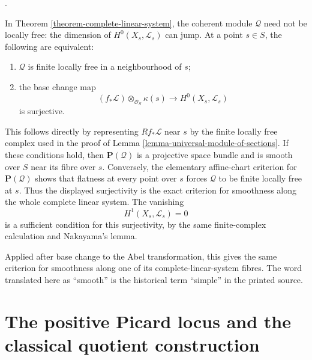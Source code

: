 \begin{remark}
\label{remark-complete-linear-system-base-change}
\begin{reference}
\cite[Expos\'e 232, Remark 4.5, pp. 153--154]{FGA}.
\end{reference}
In Theorem \ref{theorem-complete-linear-system}, the coherent module
$\mathcal{Q}$ need not be locally free: the dimension of
$H^0(X_s, \mathcal{L}_s)$ can jump. At a point $s \in S$, the following are
equivalent:
\begin{enumerate}
\item $\mathcal{Q}$ is finite locally free in a neighbourhood of $s$;
\item the base change map
$$
(f_*\mathcal{L}) \otimes_{\mathcal{O}_S} \kappa(s)
\longrightarrow H^0(X_s, \mathcal{L}_s)
$$
is surjective.
\end{enumerate}
This follows directly by representing $Rf_*\mathcal{L}$ near $s$ by the
finite locally free complex used in the proof of Lemma
\ref{lemma-universal-module-of-sections}. If these conditions hold, then
$\mathbf{P}(\mathcal{Q})$ is a projective space bundle and is smooth over
$S$ near its fibre over $s$. Conversely, the elementary affine-chart
criterion for $\mathbf{P}(\mathcal{Q})$ shows that flatness at every point
over $s$ forces $\mathcal{Q}$ to be finite locally free at $s$. Thus the
displayed surjectivity is the exact criterion for smoothness along the whole
complete linear system. The vanishing
$$
H^1(X_s, \mathcal{L}_s) = 0
$$
is a sufficient condition for this surjectivity, by the same finite-complex
calculation and Nakayama's lemma.

Applied after base change to the Abel transformation, this gives the same
criterion for smoothness along one of its complete-linear-system fibres. The
word translated here as ``smooth'' is the historical term ``simple'' in the
printed source.
\end{remark}




\section{The positive Picard locus and the classical quotient construction}
\label{section-positive-picard-locus}


